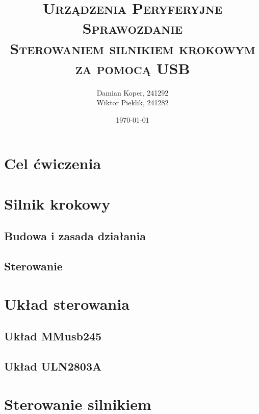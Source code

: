 \documentclass[12pt]{article}
\title{ 
    \vspace*{55mm}
    \textsc{
        \textbf{Urządzenia Peryferyjne}\\
        \large Sprawozdanie  \\
        \Large Sterowaniem silnikiem krokowym za pomocą USB
        }
}
\author{
Damian Koper,  241292\\
Wiktor Pieklik, 241282\\
}
\date{\today}
\begin{document}
\maketitle

\newpage
\setcounter{tocdepth}{2}
\localtableofcontents
\listoffigures
\lstlistoflistings

\newpage

\section{Cel ćwiczenia}
\section{Silnik krokowy}
\subsection{Budowa i zasada działania}
\subsection{Sterowanie}
\section{Układ sterowania}
\subsection{Układ MMusb245}
\subsection{Układ ULN2803A}
\section{Sterowanie silnikiem}
\end{document}

